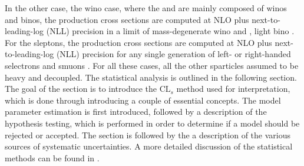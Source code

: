 In the other case, the wino case, where the \firstcharg and \secondchi are mainly composed of winos and binos, the production cross sections are computed at NLO plus next-to-leading-log (NLL) precision in a limit of mass-degenerate wino \secondchi and \firstcharg, light bino \firstchi \cite{Beenakker:1999xh, Fuks:2012qx, Fuks:2013vua}. 
For the sleptons, the production cross sections are computed at NLO plus next-to-leading-log (NLL) precision for any single generation of left- or right-handed selectrons and smuons \cite{Beenakker:1999xh, Fuks:2013lya}. 
For all these cases, all the other sparticles assumed to be heavy and decoupled.
The statistical analysis is outlined in the following section. 
The goal of the section is to introduce the $\mathrm{CL}_{s}$ method used for interpretation, which is done through introducing a couple of essential concepts. 
The model parameter estimation is first introduced, followed by a description of the hypothesis testing, which is performed in order to determine if a model should be rejected or accepted.
The section is followed by the a description of the various sources of systematic uncertainties. 
A more detailed discussion of the statistical methods can be found in \cite{Lista:2016chp}. 
